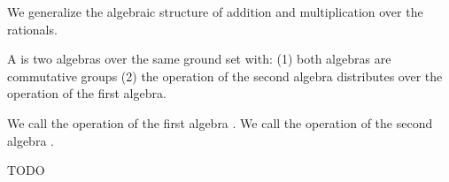 
\sbasic

















\sstart
{}


We generalize the algebraic structure of
addition and multiplication over the
rationals.


A  is two algebras over
the same ground set with:
(1) both algebras are commutative groups
(2) the operation of the second algebra
distributes over the operation of the first
algebra.

We call the operation of the first algebra
.
We call the operation of the second algebra
.


TODO
\strats
